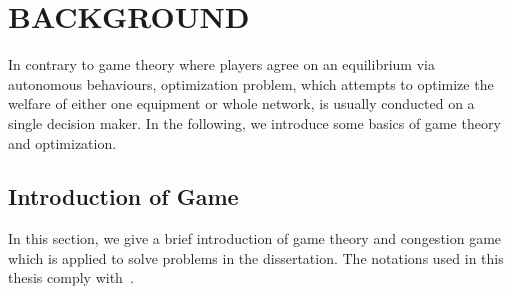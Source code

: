 \chapter{BACKGROUND}
\label{background}

In contrary to game theory where players agree on an equilibrium via autonomous behaviours, optimization problem, which attempts to optimize the welfare of either one equipment or whole network, is usually conducted on a single decision maker.
In the following, we introduce some basics of game theory and optimization.





 

\section{Introduction of Game}
In this section, we give a brief introduction of game theory and congestion game which is applied to solve problems in the dissertation.
The notations used in this thesis comply with~\cite{agt_book}.



